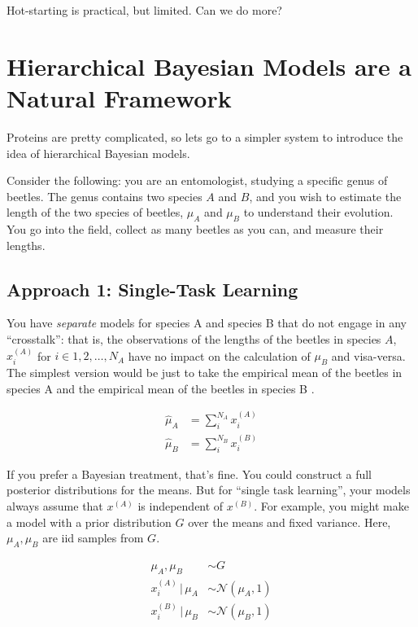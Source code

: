 \documentclass[twocolumn,floatfix,nofootinbib,aps]{revtex4-1}
\begin{document}
Hot-starting is practical, but limited. Can we do more?

\section{Hierarchical Bayesian Models are a Natural Framework}

Proteins are pretty complicated, so lets go to a simpler system to introduce the idea of hierarchical Bayesian models.

Consider the following: you are an entomologist, studying a specific genus of beetles. The genus contains two species $A$ and $B$, and you wish to estimate the length of the two species of beetles, $\mu_A$ and $\mu_B$ to understand their evolution. You go into the field, collect as many beetles as you can, and measure their lengths.

\subsection{Approach 1: Single-Task Learning}

You have \emph{separate} models for species A and species B that do not engage in any ``crosstalk'': that is, the observations of the lengths of the beetles in species $A$, $x^{(A)}_i$ for $i \in {1, 2, \ldots, N_A}$  have no impact on the calculation of $\mu_B$ and visa-versa. The simplest version would be just to take the empirical mean of the beetles in species A and the empirical mean of the beetles in species B .

\begin{align*}
\hat{\mu}_A &= \sum_i^{N_A} x^{(A)}_i \\
\hat{\mu}_B &= \sum_i^{N_B} x^{(B)}_i
\end{align*}

If you prefer a Bayesian treatment, that's fine. You could construct a full posterior distributions for the means. But for ``single task learning'', your models always assume that $x^{(A)}$ is independent of $x^{(B)}$. For example, you might make a model with a prior distribution $G$ over the means and fixed variance. Here, $\mu_A, \mu_B$ are iid samples from $G$.

\begin{align*}
\mu_A, \mu_B & \sim G \\
x^{(A)}_i \,|\, \mu_A & \sim \mathcal{N}(\mu_A, 1) \\
x^{(B)}_i \,|\, \mu_B & \sim \mathcal{N}(\mu_B, 1) \\
\end{align*}
\end{document}
